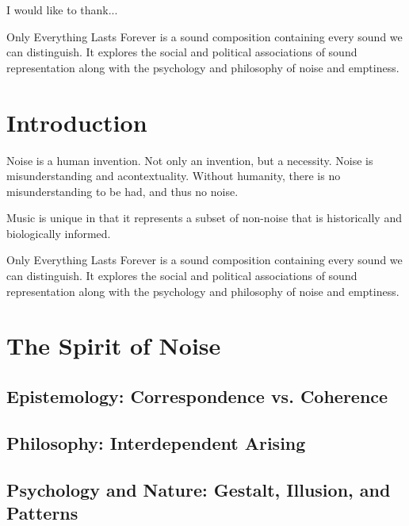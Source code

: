 \documentclass{thesis}
\author{Kyle McDonald}
\begin{document}
 
\titlepage
\tableofcontents

I would like to thank...

Only Everything Lasts Forever is a sound composition containing every sound we can distinguish. It explores the social and political associations of sound representation along with the psychology and philosophy of noise and emptiness.

\chapter{Introduction}

Noise is a human invention. Not only an invention, but a necessity. Noise is misunderstanding and acontextuality. Without humanity, there is no misunderstanding to be had, and thus no noise.

Music is unique in that it represents a subset of non-noise that is historically and biologically informed.

Only Everything Lasts Forever is a sound composition containing every sound we can distinguish. It explores the social and political associations of sound representation along with the psychology and philosophy of noise and emptiness.

\chapter{The Spirit of Noise}
\section{Epistemology: Correspondence vs. Coherence}
	\cite{Blackburn07}\cite{seti_about_????}\cite{david_correspondence_????}\cite{david_horvitz_flickr:_????}
	\cite{david_horvitz_flickr:_????-1}\cite{young_coherence_????}
\section{Philosophy: Interdependent Arising}
	\cite{Hofstadter07}\cite{Koller01}\cite{erik_thiele_tempest_????}\cite{francesco_vianello_reality_????}
	\cite{w._wayt_gibbs_hackers_2009}
\section{Psychology and Nature: Gestalt, Illusion, and Patterns}
	\cite{markowsky_misconceptions_1992}
	\cite{Moore07}\cite{Doczi81}\cite{Hofstadter01}\cite{robin_mckie_secret_2004}
	\cite{alan_dunning_paul_woodrow_and_morley_hollenberg_einsteins_2008}\cite{alexander_bogomolny_kanizsa_????}
	\cite{brian_dunning_facemars_2008}\cite{dan_paluska_holy_2005}\cite{de_lapparent_slice_1986}
	\cite{jochem_van_der_spek_no_2001}\cite{jonathan_feinberg_haiku_????}\cite{michael_bach_dalmatian_2002}
	\cite{michael_m._ross_natural_2007}\cite{padovan_proportion_1999}\cite{rips_equidistant_1994}
	\cite{weisstein_prime_????}\cite{boston.com_religious_????}
\end{document}
